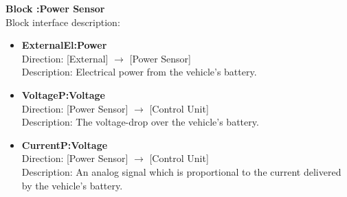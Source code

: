 \textbf{Block :Power Sensor}\\
Block interface description:
\begin{itemize}
	\item \textbf{ExternalEl:Power}\\
	Direction: [External] $\rightarrow$ [Power Sensor]\\
	Description: Electrical power from the vehicle's battery.
	\item \textbf{VoltageP:Voltage}\\
	Direction: [Power Sensor] $\rightarrow$ [Control Unit]\\
	Description: The voltage-drop over the vehicle's battery.
	\item \textbf{CurrentP:Voltage}\\
	Direction: [Power Sensor] $\rightarrow$ [Control Unit]\\
	Description: An analog signal which is proportional to the current delivered by the vehicle's battery.
\end{itemize}


